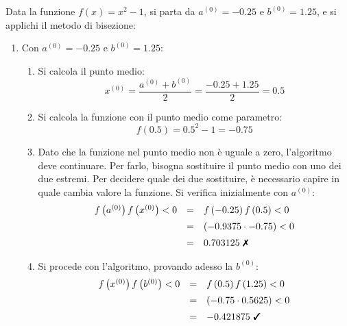 \documentclass[a4paper]{article}
\begin{document}
    \begin{examplebox}
        Data la funzione $f\left(x\right) = x^{2} - 1$, si parta da $a^{(0)} = -0.25$ e $b^{(0)} = 1.25$, e si applichi il metodo di bisezione:
        \begin{enumerate}
            \item Con $a^{(0)} = -0.25$ e $b^{(0)} = 1.25$:
            \begin{enumerate}
                \item Si calcola il punto medio:
                \begin{equation*}
                    x^{(0)} = \dfrac{a^{(0)} + b^{(0)}}{2} = \dfrac{-0.25 + 1.25}{2} = 0.5
                \end{equation*}

                \item Si calcola la funzione con il punto medio come parametro:
                \begin{equation*}
                    f\left(0.5\right) = 0.5^{2} - 1 = -0.75
                \end{equation*}

                \item Dato che la funzione nel punto medio non è uguale a zero, l'algoritmo deve continuare. Per farlo, bisogna sostituire il punto medio con uno dei due estremi. Per decidere quale dei due sostituire, è necessario capire in quale cambia valore la funzione. Si verifica inizialmente con $a^{(0)}$:
                \begin{equation*}
                    \begin{array}{rcl}
                        f\left(a^{(0)}\right)f\left(x^{(0)}\right) < 0 &=& f\left(-0.25\right)f\left(0.5\right) < 0 \\ [.5em]
                        &=& \left(-0.9375 \cdot -0.75\right) < 0 \\ [.5em]
                        &=& 0.703125 \text{ \ding{55}}
                    \end{array}
                \end{equation*}
                
                \item Si procede con l'algoritmo, provando adesso la $b^{(0)}$:
                \begin{equation*}
                    \begin{array}{rcl}
                        f\left(x^{(0)}\right)f\left(b^{(0)}\right) < 0 &=& f\left(0.5\right)f\left(1.25\right) < 0 \\ [.5em]
                        &=& \left(-0.75 \cdot 0.5625\right) < 0 \\ [.5em]
                        &=& -0.421875 \text{ \ding{51}}
                    \end{array}
                \end{equation*}


\end{enumerate}
\end{enumerate}
\end{examplebox}
\end{document}
